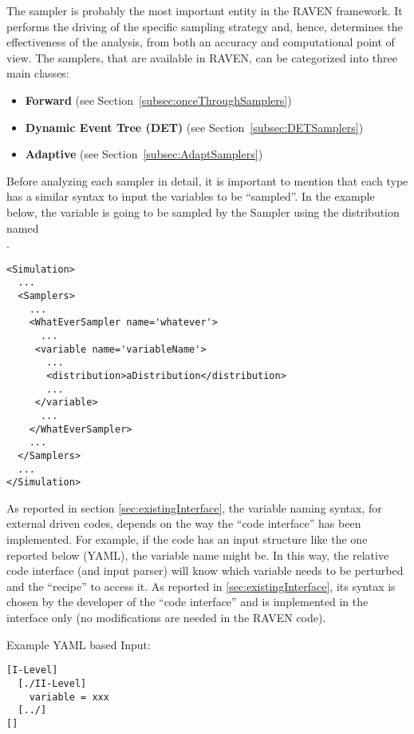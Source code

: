 The sampler is probably the most important entity in the RAVEN framework.
%
It performs the driving of the specific sampling strategy and, hence, determines
the effectiveness of the analysis, from both an accuracy and computational point
of view.
%
The samplers, that are available in RAVEN, can be categorized into three main
classes:
\begin{itemize}
\item \textbf{Forward} (see Section~\ref{subsec:onceThroughSamplers})
\item \textbf{Dynamic Event Tree (DET)} (see Section~\ref{subsec:DETSamplers})
\item \textbf{Adaptive} (see Section~\ref{subsec:AdaptSamplers})
\end{itemize}
Before analyzing each sampler in detail, it is important to mention that each
type has a similar syntax to input the variables to be ``sampled''.
%
In the example below, the variable  is going to be
sampled by the Sampler  using the distribution named\\
.
\begin{lstlisting}[style=XML]
<Simulation>
  ...
  <Samplers>
    ...
    <WhatEverSampler name='whatever'>
      ...
     <variable name='variableName'>
       ...
       <distribution>aDistribution</distribution>
       ...
     </variable>
      ...
    </WhatEverSampler>
    ...
  </Samplers>
  ...
</Simulation>
\end{lstlisting}

As reported in section \ref{sec:existingInterface}, the variable naming syntax,
for external driven codes, depends on the way the ``code interface'' has been
implemented.
%
For example, if the code has an input structure like the one reported below (YAML), the
variable name might be.
%
In this way, the relative code interface (and input parser) will know which
variable needs to be perturbed and the ``recipe'' to access it.
%
As reported in \ref{sec:existingInterface}, its syntax is chosen by the
developer of the ``code interface'' and is implemented in the interface only
(no modifications are needed in the RAVEN code).


Example YAML based Input:
\begin{lstlisting}
[I-Level]
  [./II-Level]
    variable = xxx
  [../]
[]
\end{lstlisting}

